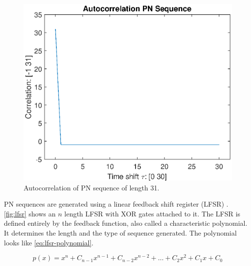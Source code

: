 \begin{figure}[t]
	\centering
	\includegraphics[width=\textwidth]{chapters/cdma-chapters/codes/autocorr-pn.eps}
	\caption{Autocorrelation of PN sequence of length 31.}
	\label{fig:autocorr-pn}
\end{figure}





PN sequences are generated using a linear feedback shift register (LFSR) \cite{Wang:1988:LFS:52007.52024}.
\autoref{fig:lfsr} shows an $n$ length LFSR with XOR gates attached to it.
The LFSR is defined entirely by the feedback function, also called a characteristic polynomial.
It determines the length and the type of sequence generated.
The polynomial looks like \autoref{eq:lfsr-polynomial}.

\begin{equation}
	\label{eq:lfsr-polynomial}
	p(x) = x^n + C_{n-1} x^{n-1}  + C_{n-2} x^{n-2} + \dotsc + C_{2} x^{2}  + C_{1} x  + C_{0}
\end{equation}

